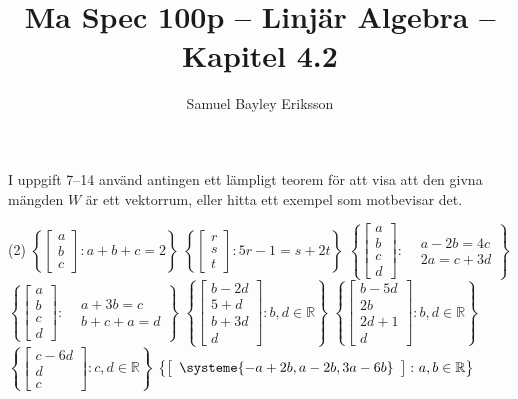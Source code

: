 \documentclass[a4paper]{article}
\title{Ma Spec 100p -- Linjär Algebra -- Kapitel 4.2}
\author{Samuel Bayley Eriksson}
\begin{document}
\maketitle
I uppgift 7--14 använd antingen ett lämpligt teorem för att visa att den givna mängden $W$ är ett vektorrum, eller hitta ett exempel som motbevisar det.
\setcounter{task}{6}
\begin{tasks}[resume, label={\bf{\arabic*.}}](2)
\task $\left\lbrace\left[\begin{array}{c}a \\ b \\ c\end{array}\right]\colon a+b+c=2\right\rbrace$
\task $\left\lbrace\left[\begin{array}{c}r \\ s \\ t\end{array}\right]\colon 5r-1=s+2t\right\rbrace$
\task $\left\lbrace\left[\begin{array}{c}a \\ b \\ c \\ d\end{array}\right]\colon\begin{aligned}&a-2b=4c\\&2a=c+3d\end{aligned}\right\rbrace$
\task $\left\lbrace\left[\begin{array}{c}a \\ b \\c \\ d\end{array}\right]\colon\begin{aligned}&a+3b=c\\&b+c+a=d\end{aligned}\right\rbrace$
\task $\left\lbrace\left[\begin{array}{c}b-2d \\ 5+d \\ b+3d \\ d\end{array}\right]\colon b,d\in\mathbb{R}\right\rbrace$
\task $\left\lbrace\left[\begin{array}{c}b-5d \\ 2b \\ 2d+1 \\ d\end{array}\right]\colon b,d\in\mathbb{R}\right\rbrace$
\task $\left\lbrace\left[\begin{array}{c}c-6d \\ d \\ c\end{array}\right]\colon c,d\in\mathbb{R}\right\rbrace$
\task $\left\lbrace\left[\begin{array}{c}\systeme{-a+2b, a-2b, 3a-6b}\end{array}\right]\colon a,b\in\mathbb{R}\right\rbrace$
\end{tasks}
\end{document}
